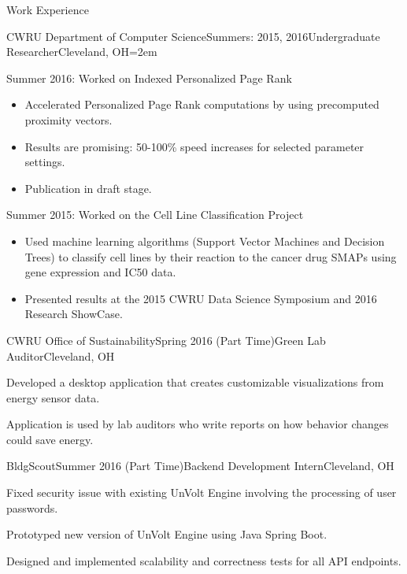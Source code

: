 \documentclass{resume} %
\begin{document}
\begin{rSection}{Work Experience}

\begin{rSubsection}{CWRU Department of Computer Science}{Summers: 2015, 2016}{Undergraduate Researcher}{Cleveland, OH}{\leftmargin=2em}

\item Summer 2016: Worked on Indexed Personalized Page Rank
{\renewcommand\labelitemi{$\cdot$}\vspace{-0.5em}
\begin{itemize}
\item Accelerated Personalized Page Rank computations by using precomputed proximity vectors.
\vspace{-0.5em}  
\item Results are promising: 50-100\% speed increases for selected parameter settings.
\vspace{-0.5em}  
\item Publication in draft stage.
\end{itemize}
}

\item Summer 2015: Worked on the Cell Line Classification Project
{\renewcommand\labelitemi{$\cdot$}\vspace{-0.5em}
\begin{itemize}
\item Used machine learning algorithms (Support Vector Machines and Decision Trees) to classify cell lines by their reaction to the cancer drug SMAPs using gene expression and IC50 data.
\vspace{-0.5em}  
\item Presented results at the 2015 CWRU Data Science Symposium and 2016 Research ShowCase.
\end{itemize}
}
\end{rSubsection}


\begin{rSubsection}{CWRU Office of Sustainability}{Spring 2016 (Part Time)}{Green Lab Auditor}{Cleveland, OH}
\item Developed a desktop application that creates customizable visualizations from energy sensor data.
\item Application is used by lab auditors who write reports on how behavior changes could save energy.
\end{rSubsection}

\begin{rSubsection}{BldgScout}{Summer 2016 (Part Time)}{Backend Development Intern}{Cleveland, OH}
\item Fixed security issue with existing UnVolt Engine involving the processing of user passwords.
\item Prototyped new version of UnVolt Engine using Java Spring Boot.
\item Designed and implemented scalability and correctness tests for all API endpoints.

\end{rSubsection}

\end{rSection}
\end{document}
